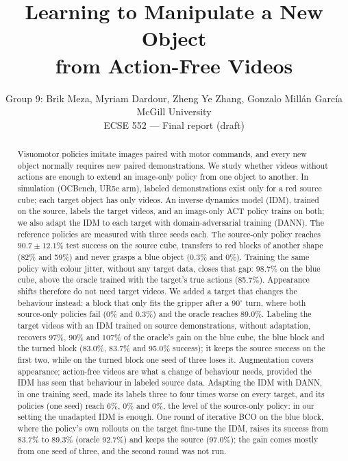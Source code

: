 \documentclass{article}
\title{Learning to Manipulate a New Object\\from Action-Free Videos}
\author{
  Group 9: Brik Meza, Myriam Dardour, Zheng Ye Zhang, Gonzalo Mill\'an Garc\'ia \\
  McGill University \\
  ECSE 552 --- Final report (draft)
}
\begin{document}
\maketitle

\begin{abstract}
  Visuomotor policies imitate images paired with motor commands, and every new object
  normally requires new paired demonstrations. We study whether videos without actions are
  enough to extend an image-only policy from one object to another. In simulation
  (OCBench, UR5e arm), labeled demonstrations exist only for a red source cube; each
  target object has only videos. An inverse dynamics model (IDM), trained on the source,
  labels the target videos, and an image-only ACT policy trains on both; we also adapt
  the IDM to each target with domain-adversarial training (DANN). The reference policies are
  measured with three seeds each. The source-only policy reaches $90.7 \pm 12.1\%$ test
  success on the source cube, transfers to red blocks of another shape (82\% and 59\%)
  and never grasps a blue object (0.3\% and 0\%). Training the same policy with colour
  jitter, without any target data, closes that gap: 98.7\% on the blue cube, above the
  oracle trained with the target's true actions (85.7\%). Appearance shifts therefore do
  not need target videos. We added a target that changes the behaviour instead: a block
  that only fits the gripper after a $90^\circ$ turn, where both source-only policies fail
  (0\% and 0.3\%) and the oracle reaches 89.0\%. Labeling the target videos with an IDM
  trained on source demonstrations, without adaptation, recovers 97\%, 90\% and 107\% of
  the oracle's gain on the blue cube, the blue block and the turned block (83.0\%,
  83.7\% and 95.0\% success); it keeps the source success on the first two, while on the
  turned block one seed of three loses it. Augmentation covers appearance; action-free
  videos are what a change of behaviour needs, provided the IDM has seen that behaviour
  in labeled source data. Adapting the IDM with DANN, in one training seed, made its
  labels three to four times worse on every target, and its policies (one seed) reach
  6\%, 0\% and 0\%, the level of the source-only policy: in our setting the unadapted IDM
  is enough. One round of iterative BCO on the blue block, where the policy's own
  rollouts on the target fine-tune the IDM, raises its success from 83.7\% to 89.3\%
  (oracle 92.7\%) and keeps the source (97.0\%); the gain comes mostly from one seed of
  three, and the second round was not run.
\end{abstract}
\end{document}
